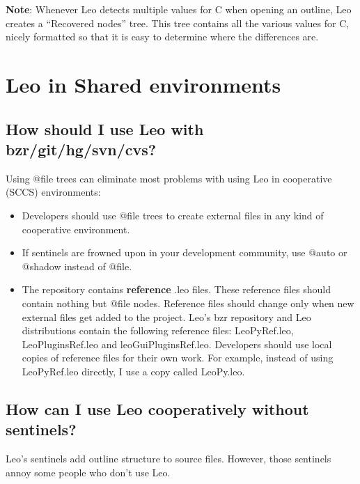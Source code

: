 \documentclass[a4paper,10pt,english]{sphinxmanual}
\begin{document}
\textbf{Note}: Whenever Leo detects multiple values for C when opening an
outline, Leo creates a ``Recovered nodes'' tree. This tree contains all the
various values for C, nicely formatted so that it is easy to determine
where the differences are.


\section{Leo in Shared environments}
\label{FAQ:leo-in-shared-environments}

\subsection{How should I use Leo with bzr/git/hg/svn/cvs?}
\label{FAQ:how-should-i-use-leo-with-bzr-git-hg-svn-cvs}
Using @file trees can eliminate most problems with using Leo in cooperative
(SCCS) environments:
\begin{itemize}
\item {} 
Developers should use @file trees to create external files in any kind of
cooperative environment.

\item {} 
If sentinels are frowned upon in your development community, use @auto or
@shadow instead of @file.

\item {} 
The repository contains \textbf{reference} .leo files. These reference files should
contain nothing but @file nodes. Reference files should change only when
new external files get added to the project. Leo's bzr repository and Leo
distributions contain the following reference files: LeoPyRef.leo,
LeoPluginsRef.leo and leoGuiPluginsRef.leo. Developers should use
local copies of reference files for their own work. For example, instead of
using LeoPyRef.leo directly, I use a copy called LeoPy.leo.

\end{itemize}


\subsection{How can I use Leo cooperatively without sentinels?}
\label{FAQ:how-can-i-use-leo-cooperatively-without-sentinels}
Leo's sentinels add outline structure to source files.
However, those sentinels annoy some people who don't use Leo.
\end{document}
